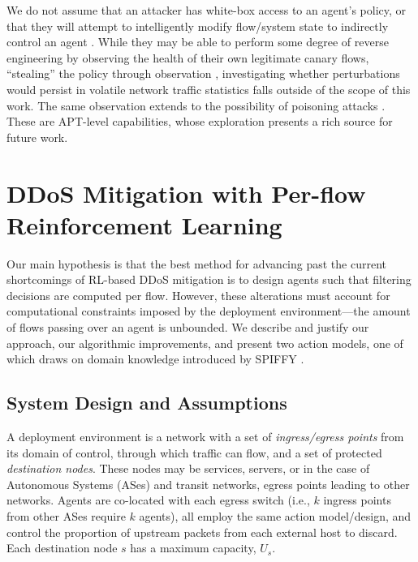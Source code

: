 \documentclass[10pt, times, comsoc]{IEEEtran}
\begin{document}
We do not assume that an attacker has white-box access to an agent's policy, or that they will attempt to intelligently modify flow/system state to indirectly control an agent \cite{DBLP:conf/eurosp/PapernotMJFCS16, DBLP:conf/eurosp/PapernotMSW18, DBLP:journals/corr/HuangPGDA17, DBLP:conf/sp/Carlini017}.
While they may be able to perform some degree of reverse engineering by observing the health of their own legitimate canary flows, ``stealing'' the policy through observation \cite{DBLP:conf/uss/TramerZJRR16}, investigating whether perturbations would persist in volatile network traffic statistics falls outside of the scope of this work.
The same observation extends to the possibility of poisoning attacks \cite{DBLP:journals/corr/abs-1902-09062}.
These are APT-level capabilities, whose exploration presents a rich source for future work.

\section{DDoS Mitigation with Per-flow Reinforcement Learning}\label{sec:ddos-mitigation-with-per-flow-reinforcement-learning}
Our main hypothesis is that the best method for advancing past the current shortcomings of RL-based DDoS mitigation is to design agents such that filtering decisions are computed per flow.
However, these alterations must account for computational constraints imposed by the deployment environment---the amount of flows passing over an agent is unbounded.
We describe and justify our approach, our algorithmic improvements, and present two action models, one of which draws on domain knowledge introduced by SPIFFY \cite{DBLP:conf/ndss/KangGS16}.

\subsection{System Design and Assumptions}
A deployment environment is a network with a set of \emph{ingress/egress points} from its domain of control, through which traffic can flow, and a set of protected \emph{destination nodes}.
These nodes may be services, servers, or in the case of Autonomous Systems (ASes) and transit networks, egress points leading to other networks.
{\color{revisiontext}\cbstart Agents are co-located with each egress switch (i.e., $k$ ingress points from other ASes require $k$ agents), all employ the same action model/design}, and control the proportion of upstream packets from each external host to discard.
Each destination node $s$ has a maximum capacity, \cbend $U_s$.
\end{document}

